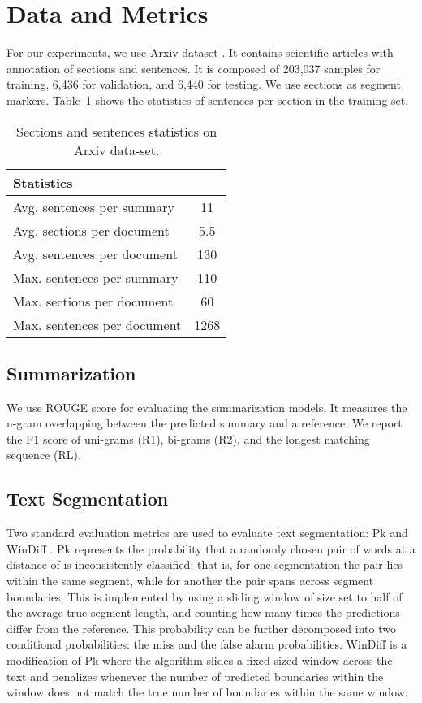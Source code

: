 \documentclass[sigconf]{acmart}
\begin{document}
\section{Data and Metrics}\label{sec:data}
For our experiments, we use Arxiv dataset \cite{cohan-etal-2018-discourse}. It contains scientific articles with annotation of sections and sentences. It is composed of 203,037 samples for training, 6,436 for validation, and 6,440 for testing. We use sections as segment markers. Table~\ref{tab:arxiv} shows the statistics of sentences per section in the training set.

\begin{table}
	\centering
\begin{tabular}{l  c } 
	\toprule
	\textbf{Statistics} & \textbf{}\\ \hline
    Avg. sentences per summary&	11\\
    Avg. sections per document&	5.5\\
    Avg. sentences per document&	130\\
    Max. sentences per summary&	110\\
    Max. sections per document&	60\\
    Max. sentences per document&	1268\\
    \bottomrule
   \end{tabular} 
\caption{Sections and sentences statistics on Arxiv data-set.}
	\label{tab:arxiv}
\end{table}

\subsection{Summarization} We use ROUGE score \cite{lin-2004-rouge} for evaluating the summarization models. It measures the n-gram overlapping between the predicted summary and a reference. We report the F1 score of uni-grams (R1), bi-grams (R2), and the longest matching sequence (RL).

\subsection{Text Segmentation} Two standard evaluation metrics are used to evaluate text segmentation: Pk \cite{beeferman1999statistical} and WinDiff \cite{pevzner-hearst-2002-critique}. Pk represents the probability that a randomly chosen pair of words at a distance of  is inconsistently classified; that is, for one segmentation the pair lies within the same segment, while for another the pair spans across segment boundaries. This is implemented by using a sliding window of size set to half of the average true segment length, and counting how many times the predictions differ from the reference. This probability can be further decomposed into two conditional probabilities: the miss and the false alarm probabilities. WinDiff is a modification of Pk where the algorithm slides a fixed-sized window across the text and penalizes whenever the number of predicted boundaries within the window does not match the true number of boundaries within the same window.
\end{document}
